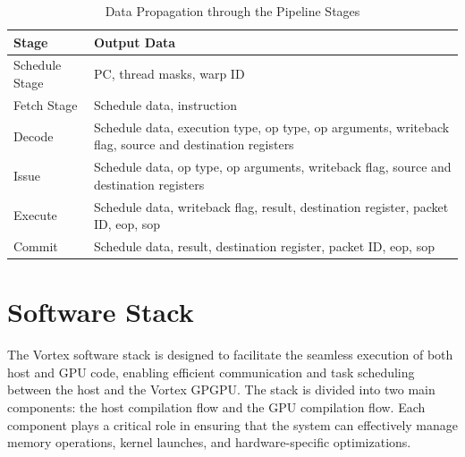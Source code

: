 \documentclass[12pt]{report}
\begin{document}
\begin{table}[H]
\centering
\renewcommand{\arraystretch}{1.5} %
\begin{tabular}{|m{4cm}|m{11cm}|} \hline
\textbf{Stage} & \textbf{Output Data} \\\hline
Schedule Stage & PC, thread masks, warp ID \\\hline
Fetch Stage & Schedule data, instruction \\\hline
Decode & Schedule data, execution type, op type, op arguments, writeback flag, source and destination registers \\\hline
Issue & Schedule data, op type, op arguments, writeback flag, source and destination registers \\\hline
Execute & Schedule data, writeback flag, result, destination register, packet ID, eop, sop \\\hline
Commit & Schedule data, result, destination register, packet ID, eop, sop \\\hline
\end{tabular}
\caption{Data Propagation through the Pipeline Stages}
\label{tab:pipeline_stages}
\end{table}


\section{Software Stack}

The Vortex software stack is designed to facilitate the seamless execution of both host and GPU code, enabling efficient communication and task scheduling between the host and the Vortex GPGPU. The stack is divided into two main components: the host compilation flow and the GPU compilation flow. Each component plays a critical role in ensuring that the system can effectively manage memory operations, kernel launches, and hardware-specific optimizations.
\end{document}
